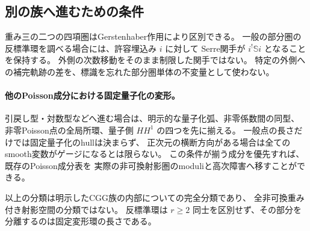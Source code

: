 

\subsection{別の族へ進むための条件}

重み三の二つの四項圏はGerstenhaber作用により区別できる。
一般の部分圏の反標準環を調べる場合には、許容埋込み $i$ に対して
Serre関手が $i^!\mathbb S i$ となることを保持する。
外側の次数移動をそのまま制限した関手ではない。
特定の外側への補完軌跡の差を、標識を忘れた部分圏単体の不変量として使わない。

\paragraph{他のPoisson成分における固定量子化の変形。}
引戻し型・対数型などへ進む場合は、明示的な量子化弧、非零係数間の同型、
非零Poisson点の全局所環、量子側 $HH^1$ の四つを先に揃える。
一般点の長さだけでは固定量子化のhullは決まらず、
正次元の横断方向がある場合は全てのsmooth変数がゲージになるとは限らない。
この条件が揃う成分を優先すれば、既存のPoisson成分表を
実際の非可換射影圏のmoduliと高次障害へ移すことができる。

以上の分類は明示したCGG族の内部についての完全分類であり、
全非可換重み付き射影空間の分類ではない。
反標準環は $r\ge2$ 同士を区別せず、その部分を分離するのは固定変形環の長さである。
